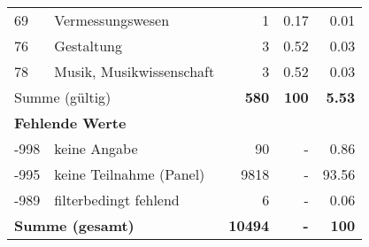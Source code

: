 \begin{longtable}{lXrrr}
        69 & \multicolumn{1}{X}{Vermessungswesen} & %
          \num{1} &
          \num[round-mode=places,round-precision=2]{0,17} &
          \num[round-mode=places,round-precision=2]{0,01} \\

        76 & \multicolumn{1}{X}{Gestaltung} & %
          \num{3} &
          \num[round-mode=places,round-precision=2]{0,52} &
          \num[round-mode=places,round-precision=2]{0,03} \\

        78 & \multicolumn{1}{X}{Musik, Musikwissenschaft} & %
          \num{3} &
          \num[round-mode=places,round-precision=2]{0,52} &
          \num[round-mode=places,round-precision=2]{0,03} \\

     \midrule
     \multicolumn{2}{l}{Summe (gültig)} &
       \textbf{\num{580}} &
     \textbf{100} &
       \textbf{\num[round-mode=places,round-precision=2]{5,53}} \\
     \multicolumn{5}{l}{\textbf{Fehlende Werte}}\\
       -998 &
       keine Angabe &
         \num{90} &
        - &
         \num[round-mode=places,round-precision=2]{0,86} \\
       -995 &
       keine Teilnahme (Panel) &
         \num{9818} &
        - &
         \num[round-mode=places,round-precision=2]{93,56} \\
       -989 &
       filterbedingt fehlend &
         \num{6} &
        - &
         \num[round-mode=places,round-precision=2]{0,06} \\
     \midrule
     \multicolumn{2}{l}{\textbf{Summe (gesamt)}} &
          \textbf{\num{10494}} &
        \textbf{-} &
        \textbf{100} \\
     \bottomrule
     \end{longtable}
     

